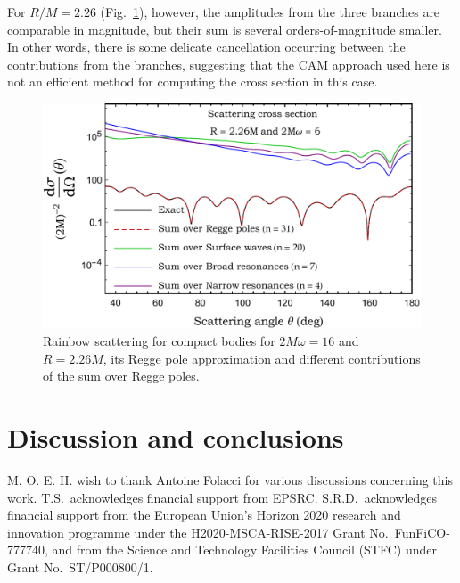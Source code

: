 \documentclass[aps,prd,longbibliography,reprint,twocolumn,amsmath,amssymb,amsfonts,showpacs,superscriptaddress]{revtex4-1}%
\begin{document}
For $R/M = 2.26$ (Fig.~\ref{Diff_Contribution_Cross_Section_R_2-dot-26_2Mw_6}), however, the amplitudes  from the three branches are comparable in magnitude, but their sum is several orders-of-magnitude smaller. In other words, there is some delicate cancellation occurring between the contributions from the branches, suggesting that the CAM approach used here is not an efficient method for computing the cross section in this case. 

\begin{figure}%
\centering
 \includegraphics[scale=0.50]{Diff_Contribution_Cross_Section_R_2-dot-26_2Mw_6}
\caption{\label{Diff_Contribution_Cross_Section_R_2-dot-26_2Mw_6} Rainbow scattering for compact bodies for $2M\omega=16$ and $R=2.26M$, its Regge pole approximation and different contributions of the sum over Regge poles.}
\end{figure}


\section{Discussion and conclusions\label{sec:conclusions}}





\acknowledgments
M. O. E. H. wish to thank Antoine Folacci for various discussions concerning this work. T.S.~acknowledges financial support from EPSRC. S.R.D.~acknowledges financial support from the European Union's Horizon 2020 research and innovation programme under the H2020-MSCA-RISE-2017 Grant No.~FunFiCO-777740, and from the Science and Technology Facilities Council (STFC) under Grant No.~ST/P000800/1.





\end{document}
